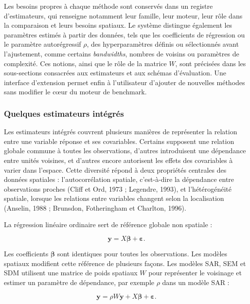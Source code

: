 \documentclass[11pt,a4paper]{article}
\begin{document}
Les besoins propres à chaque méthode sont conservés dans un registre d'estimateurs, qui renseigne notamment leur famille, leur moteur, leur rôle dans la comparaison et leurs besoins spatiaux. Le système distingue également les paramètres estimés à partir des données, tels que les coefficients de régression ou le paramètre autorégressif $\rho$, des hyperparamètres définis ou sélectionnés avant l'ajustement, comme certains \textit{bandwidths}, nombres de voisins ou paramètres de complexité. Ces notions, ainsi que le rôle de la matrice $W$, sont précisées dans les sous-sections consacrées aux estimateurs et aux schémas d'évaluation. Une interface d'extension permet enfin à l'utilisateur d'ajouter de nouvelles méthodes sans modifier le cœur du moteur de benchmark.


\subsubsection{Quelques estimateurs intégrés}

Les estimateurs intégrés couvrent plusieurs manières de représenter la relation entre une variable réponse et ses covariables. Certains supposent une relation globale commune à toutes les observations, d'autres introduisent une dépendance entre unités voisines, et d'autres encore autorisent les effets des covariables à varier dans l'espace. Cette diversité répond à deux propriétés centrales des données spatiales : l'autocorrélation spatiale, c'est-à-dire la dépendance entre observations proches (Cliff et Ord, 1973 ; Legendre, 1993), et l'hétérogénéité spatiale, lorsque les relations entre variables changent selon la localisation (Anselin, 1988 ; Brunsdon, Fotheringham et Charlton, 1996).

La régression linéaire ordinaire sert de référence globale non spatiale :

\begin{equation}
    \mathbf{y}=X\boldsymbol{\beta}+\boldsymbol{\varepsilon}.
\end{equation}

Les coefficients $\boldsymbol{\beta}$ sont identiques pour toutes les observations. Les modèles spatiaux modifient cette référence de plusieurs façons. Les modèles SAR, SEM et SDM utilisent une matrice de poids spatiaux $W$ pour représenter le voisinage et estimer un paramètre de dépendance, par exemple $\rho$ dans un modèle SAR :

\begin{equation}
    \mathbf{y}=\rho W\mathbf{y}+X\boldsymbol{\beta}+\boldsymbol{\varepsilon}.
\end{equation}
\end{document}
